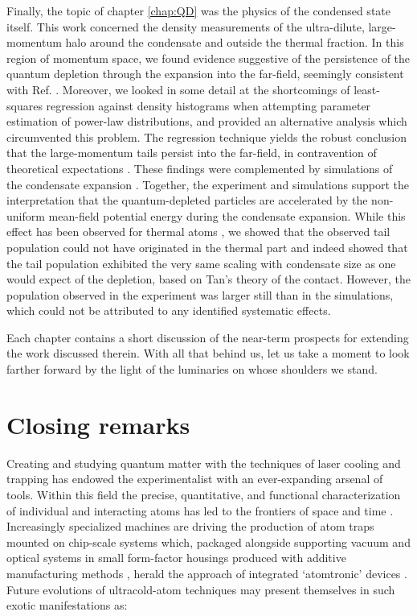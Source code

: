	Finally, the topic of chapter \ref{chap:QD} was the physics of the condensed state itself.
	This work concerned the density measurements of the ultra-dilute, large-momentum halo around the condensate and outside the thermal fraction.
	In this region of momentum space, we found evidence suggestive of the persistence of the quantum depletion through the expansion into the far-field, seemingly  consistent with Ref. \cite{Chang16}.
	Moreover, we looked in some detail at the shortcomings of least-squares regression against density histograms when attempting parameter estimation of power-law distributions, and provided an alternative analysis which circumvented this problem.
	The regression technique yields the robust conclusion that the large-momentum tails persist into the far-field, in contravention of theoretical expectations \cite{Qu16,Xu06}.
	These findings were complemented by simulations of the condensate expansion \cite{Ross21}. 
	Together, the experiment and simulations support the interpretation that the quantum-depleted particles are accelerated by the non-uniform mean-field potential energy during the condensate expansion.
	While this effect has been observed for thermal atoms \cite{Ozeri02}, we showed that the observed tail population could not have originated in the thermal part and indeed showed that the tail population exhibited the very same scaling with condensate size as one would expect of the depletion, based on Tan's theory of the contact.
	However, the population observed in the experiment was larger still than in the simulations, which could not be attributed to any identified systematic effects.

	Each chapter contains a short discussion of the near-term prospects for extending the work discussed therein.
	With all that behind us, let us take a moment to look farther forward by the light of the luminaries on whose shoulders we stand.




\section*{Closing remarks}
	
	Creating and studying quantum matter with the techniques of laser cooling and trapping has endowed the experimentalist with an ever-expanding arsenal of tools.
	Within this field the precise, quantitative, and functional characterization of individual and interacting atoms has led to the frontiers of space \cite{Aveline20} and time \cite{LeTargat13}.
	Increasingly specialized machines are driving the production of atom traps mounted on chip-scale systems \cite{AtomChips} which, packaged alongside supporting vacuum and optical systems in small form-factor housings produced with additive manufacturing methods \cite{Madkhaly21}, herald the approach of integrated `atomtronic' devices \cite{Amico21}.
	Future evolutions of ultracold-atom techniques may present themselves in such exotic manifestations as:
	
